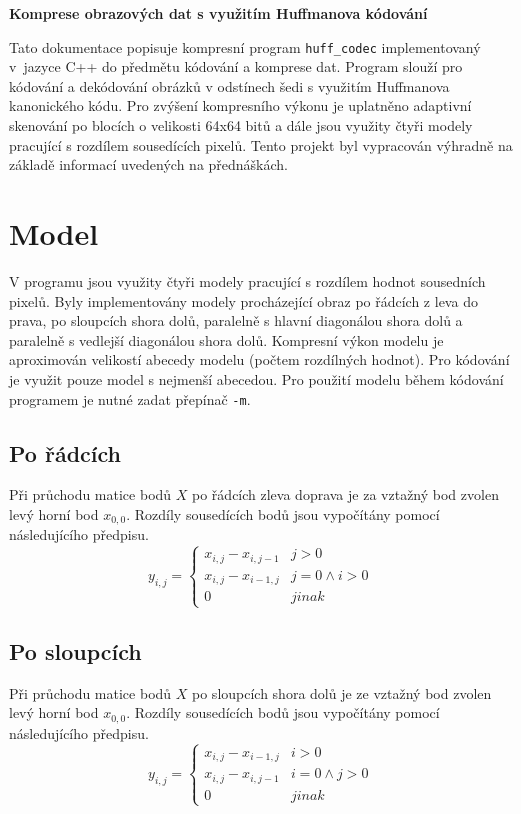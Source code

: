 \documentclass[a4paper, 11pt, fleqn]{scrartcl}
\newcommand{\NAZEV}{\textbf{Komprese obrazových dat s využitím Huffmanova kódování}}
\begin{document}
  \begin{center}
    {\Large \NAZEV}
  \end{center}

  \vspace*{2em}

    Tato dokumentace popisuje kompresní program \texttt{huff\_codec} implementovaný v~jazyce C++ do předmětu kódování a komprese dat. Program slouží pro kódování a dekódování obrázků v odstínech šedi s využitím Huffmanova kanonického kódu. Pro zvýšení kompresního výkonu je uplatněno adaptivní skenování po blocích o velikosti 64x64 bitů a dále jsou využity čtyři modely pracující s rozdílem sousedících pixelů. Tento projekt byl vypracován výhradně na základě informací uvedených na přednáškách.

  \section{Model}
    V programu jsou využity čtyři modely pracující s rozdílem hodnot sousedních pixelů. Byly implementovány modely procházející obraz po řádcích z leva do prava, po sloupcích shora dolů, paralelně s hlavní diagonálou shora dolů a paralelně s vedlejší diagonálou shora dolů. Kompresní výkon modelu je aproximován velikostí abecedy modelu (počtem rozdílných hodnot). Pro kódování je využit pouze model s nejmenší abecedou. Pro použití modelu během kódování programem je nutné zadat přepínač \texttt{-m}.

    \subsection{Po řádcích}
      Při průchodu matice bodů $X$ po řádcích zleva doprava je za vztažný bod zvolen levý horní bod $x_{0,0}$. Rozdíly sousedících bodů jsou vypočítány pomocí následujícího předpisu.
      $$
      y_{i,j} = \begin{cases}
                  x_{i,j} - x_{i,j-1}   & j > 0\\
                  x_{i,j} - x_{i-1,j}   & j = 0 \land i > 0\\
                  0                     & jinak
                \end{cases}
      $$

    \subsection{Po sloupcích}
      Při průchodu matice bodů $X$ po sloupcích shora dolů je ze vztažný bod zvolen levý horní bod $x_{0,0}$. Rozdíly sousedících bodů jsou vypočítány pomocí následujícího předpisu.
      $$
      y_{i,j} = \begin{cases}
                  x_{i,j} - x_{i-1,j}   & i > 0\\
                  x_{i,j} - x_{i,j-1}   & i = 0 \land j > 0\\
                  0                     & jinak
                \end{cases}
      $$
\end{document}

